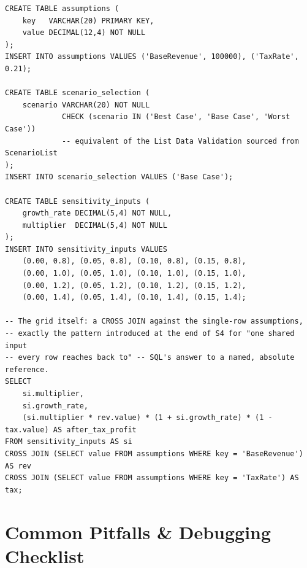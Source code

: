 \documentclass[11pt,a4paper]{article}
\begin{document}
\begin{lstlisting}[style=sqlstyle, caption={The same assumptions, expressed as governed, constrained tables}]
CREATE TABLE assumptions (
    key   VARCHAR(20) PRIMARY KEY,
    value DECIMAL(12,4) NOT NULL
);
INSERT INTO assumptions VALUES ('BaseRevenue', 100000), ('TaxRate', 0.21);

CREATE TABLE scenario_selection (
    scenario VARCHAR(20) NOT NULL
             CHECK (scenario IN ('Best Case', 'Base Case', 'Worst Case'))
             -- equivalent of the List Data Validation sourced from ScenarioList
);
INSERT INTO scenario_selection VALUES ('Base Case');

CREATE TABLE sensitivity_inputs (
    growth_rate DECIMAL(5,4) NOT NULL,
    multiplier  DECIMAL(5,4) NOT NULL
);
INSERT INTO sensitivity_inputs VALUES
    (0.00, 0.8), (0.05, 0.8), (0.10, 0.8), (0.15, 0.8),
    (0.00, 1.0), (0.05, 1.0), (0.10, 1.0), (0.15, 1.0),
    (0.00, 1.2), (0.05, 1.2), (0.10, 1.2), (0.15, 1.2),
    (0.00, 1.4), (0.05, 1.4), (0.10, 1.4), (0.15, 1.4);

-- The grid itself: a CROSS JOIN against the single-row assumptions,
-- exactly the pattern introduced at the end of S4 for "one shared input
-- every row reaches back to" -- SQL's answer to a named, absolute reference.
SELECT
    si.multiplier,
    si.growth_rate,
    (si.multiplier * rev.value) * (1 + si.growth_rate) * (1 - tax.value) AS after_tax_profit
FROM sensitivity_inputs AS si
CROSS JOIN (SELECT value FROM assumptions WHERE key = 'BaseRevenue') AS rev
CROSS JOIN (SELECT value FROM assumptions WHERE key = 'TaxRate') AS tax;
\end{lstlisting}

\section{Common Pitfalls \& Debugging Checklist}
\end{document}
